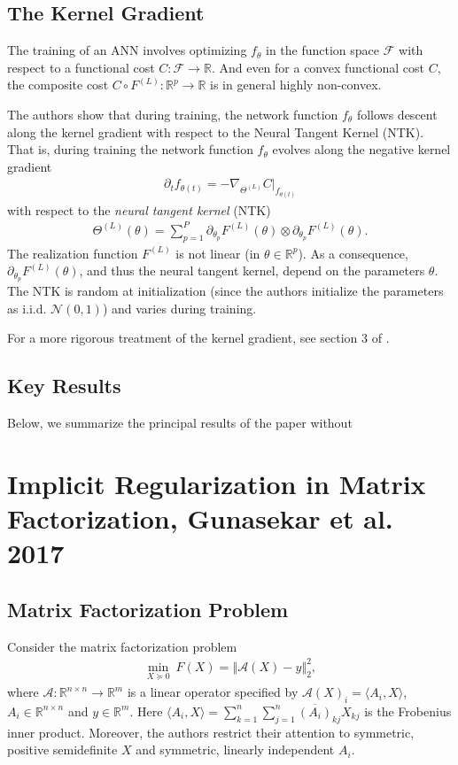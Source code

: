 \documentclass{article}
\begin{document}
\subsection{The Kernel Gradient}
The training of an ANN involves optimizing $f_{\theta}$ in the function space $\mathcal{F}$ with respect to a functional cost $C: \mathcal{F} \rightarrow \mathbb{R}$. And even for a convex functional cost $C$, the composite cost $C \circ F^{(L)}: \mathbb{R}^p \rightarrow \mathbb{R}$ is in general highly non-convex. 

The authors show that during training, the network function $f_{\theta}$ follows descent along the kernel gradient with respect to the Neural Tangent Kernel (NTK). That is, during training the network function $f_{\theta}$ evolves along the negative kernel gradient
\begin{align*}
    \partial_t f_{\theta(t)} = - \nabla_{\Theta^{(L)}} C|_{f_{\theta(t)}}
\end{align*}
with respect to the \textit{neural tangent kernel} (NTK)
\begin{align*}
    \Theta^{(L)}(\theta) = \sum_{p=1}^P \partial_{\theta_p} F^{(L)}(\theta) \otimes \partial_{\theta_p} F^{(L)}(\theta).
\end{align*}
The realization function $F^{(L)}$ is not linear (in $\theta \in \mathbb{R}^p$). As a consequence, $\partial_{\theta_p} F^{(L)}(\theta)$, and thus the neural tangent kernel, depend on the parameters $\theta$. The NTK is random at initialization (since the authors initialize the parameters as i.i.d. $\mathcal{N}(0,1)$) and varies during training. 

For a more rigorous treatment of the kernel gradient, see section 3 of \cite{woodworth2020kernel}.

\subsection{Key Results}
Below, we summarize the principal results of the paper without 

\section{Implicit Regularization in Matrix Factorization, Gunasekar et al. 2017}
\subsection{Matrix Factorization Problem}
Consider the matrix factorization problem
\begin{align*}
    \underset{X \succeq 0}{\min} \ F(X) = \left\Vert \mathcal{A}(X) - y \right\Vert_2^2,
\end{align*}
where $\mathcal{A}: \mathbb{R}^{n \times n} \rightarrow \mathbb{R}^m$ is a linear operator specified by $\mathcal{A}(X)_i = \langle A_i, X \rangle$, $A_i \in \mathbb{R}^{n \times n}$ and $y \in \mathbb{R}^m$. Here $\langle A_i, X \rangle = \sum_{k=1}^n \sum_{j=1}^n \overline{(A_i)}_{kj} X_{kj}$ is the Frobenius inner product. Moreover, the authors restrict their attention to symmetric, positive semidefinite $X$ and symmetric, linearly independent $A_i$.
\end{document}
